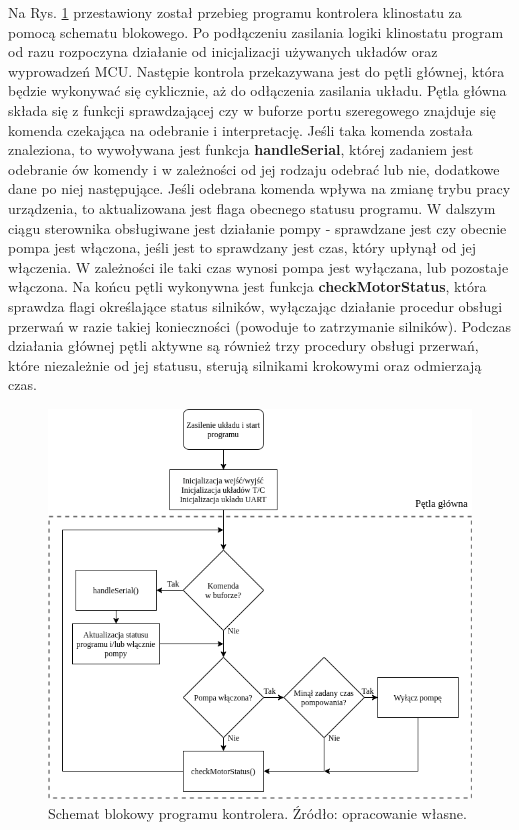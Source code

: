 Na Rys. \ref{fig:schemat_sterownik} przestawiony został przebieg programu kontrolera klinostatu za pomocą schematu blokowego. Po podłączeniu zasilania logiki klinostatu program od razu rozpoczyna działanie od inicjalizacji używanych układów oraz wyprowadzeń MCU. Następie kontrola przekazywana jest do pętli głównej, która będzie wykonywać się cyklicznie, aż do odłączenia zasilania układu. Pętla główna składa się z funkcji sprawdzającej czy w buforze portu szeregowego znajduje się komenda czekająca na odebranie i interpretację. Jeśli taka komenda została znaleziona, to wywoływana jest funkcja \textbf{handleSerial}, której zadaniem jest odebranie ów komendy i w zależności od jej rodzaju odebrać lub nie, dodatkowe dane po niej następujące. Jeśli odebrana komenda wpływa na zmianę trybu pracy urządzenia, to aktualizowana jest flaga obecnego statusu programu. W dalszym ciągu sterownika obsługiwane jest działanie pompy - sprawdzane jest czy obecnie pompa jest włączona, jeśli jest to sprawdzany jest czas, który upłynął od jej włączenia. W zależności ile taki czas wynosi pompa jest wyłączana, lub pozostaje włączona. Na końcu pętli wykonywna jest funkcja \textbf{checkMotorStatus}, która sprawdza flagi określające status silników, wyłączając działanie procedur obsługi przerwań w razie takiej konieczności (powoduje to zatrzymanie silników). Podczas działania głównej pętli aktywne są również trzy procedury obsługi przerwań, które niezależnie od jej statusu, sterują silnikami krokowymi oraz odmierzają czas.
\begin{figure}
	\centering
	\includegraphics[scale=0.5]{sterownik_schemat}
	\caption{Schemat blokowy programu kontrolera. Źródło: opracowanie własne.} 
	\label{fig:schemat_sterownik}
\end{figure}


